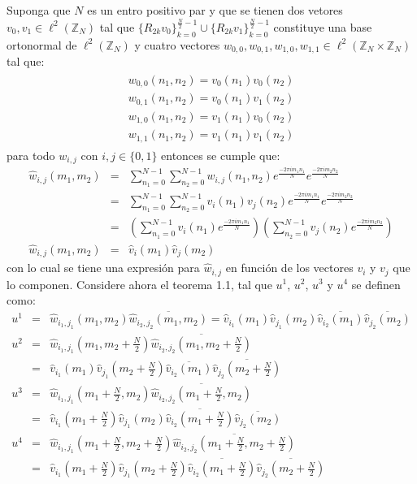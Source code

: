 \par Suponga que $N$ es un entro positivo par y que se tienen dos vetores $v_0,v_1\in\ell^2(\mathbb{Z}_N)$ tal que $\{R_{2k}v_0\}_{k=0}^{\frac{N}{2}-1}\cup\{R_{2k}v_1\}_{k=0}^{\frac{N}{2}-1}$ constituye una base ortonormal de $\ell^2(\mathbb{Z}_N)$ y cuatro vectores $w_{0,0},w_{0,1},w_{1,0},w_{1,1}\in\ell^2(\mathbb{Z}_N\times\mathbb{Z}_N)$ tal que:
\begin{eqnarray}
\begin{array}{c}
w_{0,0}(n_1,n_2)=v_0(n_1)v_0(n_2)\\
w_{0,1}(n_1,n_2)=v_0(n_1)v_1(n_2)\\
w_{1,0}(n_1,n_2)=v_1(n_1)v_0(n_2)\\
w_{1,1}(n_1,n_2)=v_1(n_1)v_1(n_2)
\label{definicion-filtro-2d}
\end{array}
\end{eqnarray}
para todo $w_{i,j}$ con $i,j\in\{0,1\}$ entonces se cumple que:
\begin{eqnarray}
\hat{w}_{i,j}(m_1,m_2)&=&\sum_{n_1=0}^{N-1}\sum_{n_2=0}^{N-1}w_{i,j}(n_1,n_2)e^{\frac{-2\pi im_1n_1}{N}}e^{\frac{-2\pi im_2n_2}{N}}\nonumber\\
&=&\sum_{n_1=0}^{N-1}\sum_{n_2=0}^{N-1}v_i(n_1)v_j(n_2)e^{\frac{-2\pi im_1n_1}{N}}e^{\frac{-2\pi im_2n_2}{N}}\nonumber\\
&=&\left(\sum_{n_1=0}^{N-1}v_i(n_1)e^{\frac{-2\pi im_1n_1}{N}}\right)\left(\sum_{n_2=0}^{N-1}v_j(n_2)e^{\frac{-2\pi im_2n_2}{N}}\right)\nonumber\\
\hat{w}_{i,j}(m_1,m_2)&=&\hat{v}_i(m_1)\hat{v}_j(m_2)\nonumber
\end{eqnarray}
con lo cual se tiene una expresi\'on para $\hat{w}_{i,j}$ en funci\'on de los vectores $v_i$ y $v_j$ que lo componen. Considere ahora el teorema 1.1, tal que $u^1$, $u^2$, $u^3$ y $u^4$ se definen como:
\begin{eqnarray}
u^1&=&\hat{w}_{i_1,j_1}(m_1,m_2)\overline{\hat{w}_{i_2,j_2}(m_1,m_2)}=\hat{v}_{i_1}(m_1)\hat{v}_{j_1}(m_2)\overline{\hat{v}_{i_2}(m_1)}\overline{\hat{v}_{j_2}(m_2)}\nonumber\\
u^2&=&\hat{w}_{i_1,j_1}\left(m_1,m_2+\frac{N}{2}\right)\overline{\hat{w}_{i_2,j_2}\left(m_1,m_2+\frac{N}{2}\right)}\nonumber\\&=&\hat{v}_{i_1}(m_1)\hat{v}_{j_1}\left(m_2+\frac{N}{2}\right)\overline{\hat{v}_{i_2}(m_1)}\overline{\hat{v}_{j_2}\left(m_2+\frac{N}{2}\right)}\nonumber\\
u^3&=&\hat{w}_{i_1,j_1}\left(m_1+\frac{N}{2},m_2\right)\overline{\hat{w}_{i_2,j_2}\left(m_1+\frac{N}{2},m_2\right)}\nonumber\\&=&\hat{v}_{i_1}\left(m_1+\frac{N}{2}\right)\hat{v}_{j_1}\left(m_2\right)\overline{\hat{v}_{i_2}\left(m_1+\frac{N}{2}\right)}\overline{\hat{v}_{j_2}\left(m_2\right)}\nonumber\\
u^4&=&\hat{w}_{i_1,j_1}\left(m_1+\frac{N}{2},m_2+\frac{N}{2}\right)\overline{\hat{w}_{i_2,j_2}\left(m_1+\frac{N}{2},m_2+\frac{N}{2}\right)}\nonumber\\&=&\hat{v}_{i_1}\left(m_1+\frac{N}{2}\right)\hat{v}_{j_1}\left(m_2+\frac{N}{2}\right)\overline{\hat{v}_{i_2}\left(m_1+\frac{N}{2}\right)}\overline{\hat{v}_{j_2}\left(m_2+\frac{N}{2}\right)}\nonumber
\end{eqnarray}
